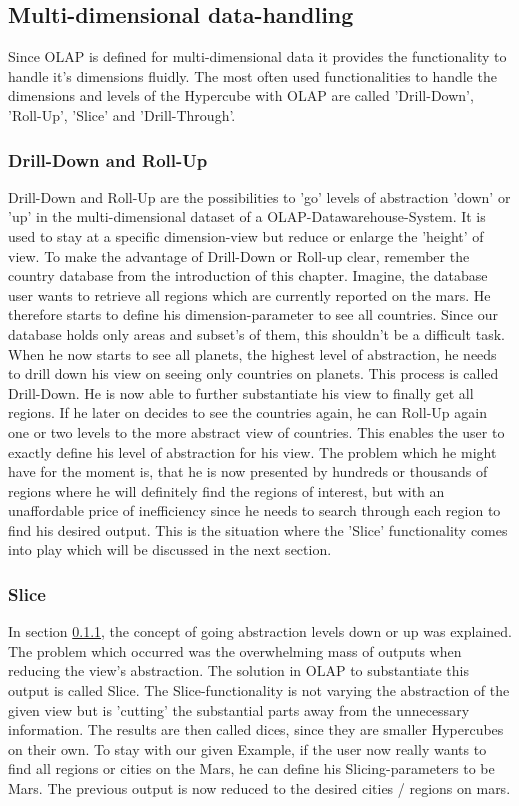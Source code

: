 \documentclass[12pt,a4paper,oneside, 
liststotoc, 					%
bibtotoc,						%
titlepage, 						%
headsepline, 					%
BCOR6mm,						%
openany,							%
]{scrreprt}
\begin{document}
\subsection{Multi-dimensional data-handling}\label{multdimhandling}
Since OLAP is defined for multi-dimensional data it provides the functionality to handle it's dimensions fluidly. The most often used functionalities to handle the dimensions and levels of the Hypercube with OLAP are called 'Drill-Down', 'Roll-Up', 'Slice' and 'Drill-Through'.
\subsubsection{Drill-Down and Roll-Up}\label{drru}
Drill-Down and Roll-Up are the possibilities to 'go' levels of abstraction 'down' or 'up' in the multi-dimensional dataset of a OLAP-Datawarehouse-System. It is used to stay at a specific dimension-view but reduce or enlarge the 'height' of view. To make the advantage of Drill-Down or Roll-up clear, remember the country database from the introduction of this chapter. Imagine, the database user wants to retrieve all regions which are currently reported on the mars. He therefore starts to define his dimension-parameter to see all countries. Since our database holds only areas and subset's of them, this shouldn't be a difficult task. When he now starts to see all planets, the highest level of abstraction, he needs to drill down his view on seeing only countries on planets. This process is called Drill-Down. He is now able to further substantiate his view to finally get all regions. If he later on decides to see the countries again, he can Roll-Up again one or two levels to the more abstract view of countries. This enables the user to exactly define his level of abstraction for his view. The problem which he might have for the moment is, that he is now presented by hundreds or thousands of regions where he will definitely find the regions of interest, but with an unaffordable price of inefficiency since he needs to search through each region to find his desired output. This is the situation where the 'Slice' functionality comes into play which will be discussed in the next section.
\subsubsection{Slice}\label{slice}
In section \ref{drru}, the concept of going abstraction levels down or up was explained. The problem which occurred was the overwhelming mass of outputs when reducing the view's abstraction. The solution in OLAP to substantiate this output is called Slice. The Slice-functionality is not varying the abstraction of the given view but is 'cutting' the substantial parts away from the unnecessary information. The results are then called dices, since they are smaller Hypercubes on their own. To stay with our given Example, if the user now really wants to find all regions or cities on the Mars, he can define his Slicing-parameters to be Mars. The previous output is now reduced to the desired cities / regions on mars.
\end{document}
